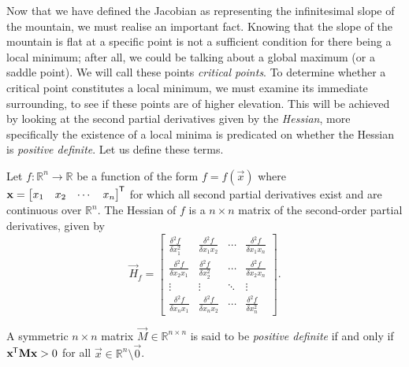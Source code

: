 Now that we have defined the Jacobian as representing the infinitesimal slope of the mountain, we must realise an important fact.
Knowing that the slope of the mountain is flat at a specific point is not a sufficient condition for there being a local minimum; after all, we could be talking about a global maximum (or a saddle point).
We will call these points \textit{critical points}.
To determine whether a critical point constitutes a local minimum, we must examine its immediate surrounding, to see if these points are of higher elevation.
This will be achieved by looking at the second partial derivatives given by the \textit{Hessian}, more specifically the existence of a local minima is predicated on whether the Hessian is \textit{positive definite}.
Let us define these terms.
\begin{definition}[Hessian]
    Let $f: \mathbb{R}^n \rightarrow \mathbb{R}$ be a function of the form
    $f=f\left(\vec{x}\right)$
    where
    $\mathbf{x} = \begin{bmatrix}
        x_1 & x_2 & \cdots & x_n
    \end{bmatrix}^{\mkern-1.5mu\mathsf{T}}$
    for which all second partial derivatives exist and are continuous over $\mathbb{R}^n$.
    The Hessian of $f$ is a $n\times n$ matrix of the second-order partial derivatives, given by
    \begin{equation*}
        \vec{H}_f = \begin{bmatrix}
            \frac{\delta^2 f}{\delta x_1^2} &
            \frac{\delta^2 f}{\delta x_1 x_2} &
            \cdots &
            \frac{\delta^2 f}{\delta x_1 x_n} \\
            \frac{\delta^2 f}{\delta x_2 x_1} &
            \frac{\delta^2 f}{\delta x_2^2} &
            \cdots &
            \frac{\delta^2 f}{\delta x_2 x_n} \\
            \vdots & \vdots & \ddots & \vdots \\
            \frac{\delta^2 f}{\delta x_n x_1} &
            \frac{\delta^2 f}{\delta x_n x_2} &
            \cdots &
            \frac{\delta^2 f}{\delta x_n^2}
        \end{bmatrix}.
    \end{equation*}
\end{definition}
\begin{definition}
    \label{def:positive_definite}
    A symmetric $n\times n$ matrix $\vec{M} \in \mathbb{R}^{n\times n}$ is said to be \textit{positive definite} if and only if
    $\mathbf{x}^{\mkern-1.5mu\mathsf{T}} \mathbf{M} \mathbf{x} > 0$
    for all $\vec{x} \in \mathbb{R}^n \setminus \vec{0}$.
\end{definition}
